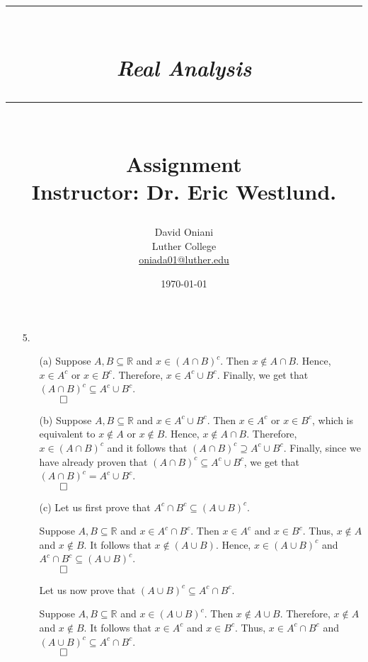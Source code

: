 \documentclass[11pt]{article}
\author{David Oniani\\
        Luther College\\
        \href{mailto:oniada01@luther.edu}{oniada01@luther.edu}}
\title{\rule{\paperwidth - 150pt}{1pt}\textbf{\\\textit{Real Analysis}\\}\rule
{\paperwidth - 150pt}{1pt}\\\textbf{Assignment \textnumero1}\\{\normalsize
Instructor: Dr. Eric Westlund.}}
\date{\today}
\begin{document}
\maketitle

%

\begin{itemize}
    \item[5.]
    \begin{itemize}
        \item[(a)]
        Suppose $A, B \subseteq \mathbb{R}$ and $x \in (A \cap B)^c$. Then $x
        \notin A \cap B$. Hence, $x \in A^c$ or $x \in B^c$. Therefore, $x \in
        A^c \cup B^c$. Finally, we get that $(A \cap B)^c \subseteq A^c \cup
        B^c$.\\
        $\qed$

        \item[(b)]
        Suppose $A, B \subseteq \mathbb{R}$ and $x \in A^c \cup B^c$. Then $x
        \in A^c$ or $x \in B^c$, which is equivalent to $x \notin A$ or $x
        \notin B$. Hence, $x \notin A \cap B$. Therefore, $x \in (A \cap B)^c$
        and it follows that $(A \cap B)^c \supseteq A^c \cup B^c$. Finally,
        since we have already proven that $(A \cap B)^c \subseteq A^c \cup
        B^c$, we get that $(A \cap B)^c = A^c \cup B^c$.\\
        $\qed$

        \item[(c)]
        Let us first prove that $A^c \cap B^c \subseteq (A \cup B)^c$.

        Suppose $A, B \subseteq \mathbb{R}$ and $x \in A^c \cap B^c$. Then $x
        \in A^c$ and $x \in B^c$. Thus, $x \notin A$ and $x \notin B$. It
        follows that $x \notin (A \cup B)$. Hence, $x \in (A \cup B)^c$ and
        $A^c \cap B^c \subseteq (A \cup B)^c$.\\
        $\qed$

        Let us now prove that $(A \cup B)^c \subseteq A^c \cap B^c$.

        Suppose $A, B \subseteq \mathbb{R}$ and $x \in (A \cup B)^c$. Then $x
        \notin A \cup B$. Therefore, $x \notin A$ and $x \notin B$. It follows
        that $x \in A^c$ and $x \in B^c$. Thus, $x \in A^c \cap B^c$ and $(A
        \cup B)^c \subseteq A^c \cap B^c$.\\
        $\qed$


\end{itemize}
\end{itemize}
\end{document}
